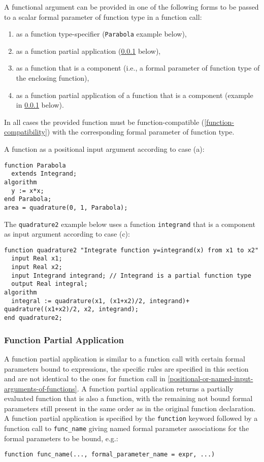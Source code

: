 A functional argument can be provided in one of the following forms to
be passed to a scalar formal parameter of function type in a function
call:
\begin{enumerate}
\def\labelenumi{\alph{enumi})}
\item
  as a function type-specifier (\lstinline!Parabola! example below),
\item
  as a function partial application (\cref{function-partial-application} below),
\item
  as a function that is a component (i.e., a formal parameter of function type of the enclosing function),
\item
  as a function partial application of a function that is a component
  (example in \cref{function-partial-application} below).
\end{enumerate}

In all cases the provided function must be function-compatible (\cref{function-compatibility}) with the corresponding formal parameter of function type.

\begin{example}
A function as a positional input argument according to case (a):
\begin{lstlisting}[language=modelica]
function Parabola
  extends Integrand;
algorithm
  y := x*x;
end Parabola;
area = quadrature(0, 1, Parabola);
\end{lstlisting}
The \lstinline!quadrature2! example below uses a function \lstinline!integrand! that is a
component as input argument according to case (c):
\begin{lstlisting}[language=modelica]
function quadrature2 "Integrate function y=integrand(x) from x1 to x2"
  input Real x1;
  input Real x2;
  input Integrand integrand; // Integrand is a partial function type
  output Real integral;
algorithm
  integral := quadrature(x1, (x1+x2)/2, integrand)+  quadrature((x1+x2)/2, x2, integrand);
end quadrature2;
\end{lstlisting}
\end{example}

\subsubsection{Function Partial Application}\label{function-partial-application}

A function partial application is similar to a function call with
certain formal parameters bound to expressions, the specific rules are
specified in this section and are not identical to the ones for function
call in \cref{positional-or-named-input-arguments-of-functions}. A function partial application returns a partially
evaluated function that is also a function, with the remaining not bound
formal parameters still present in the same order as in the original
function declaration. A function partial application is specified by the
\lstinline!function! keyword followed by a function call to \lstinline!func_name!
giving named formal parameter associations for the formal parameters to
be bound, e.g.:
\begin{lstlisting}[language=modelica]
function func_name(..., formal_parameter_name = expr, ...)
\end{lstlisting}

